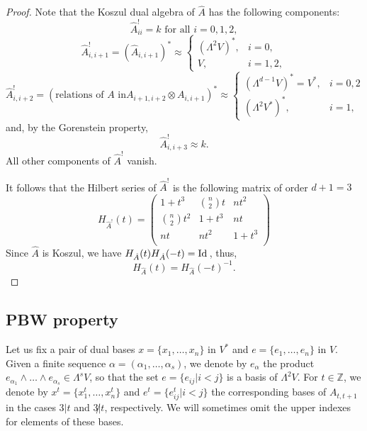 \documentclass{amsart}
\numberwithin{equation}{section}
\theoremstyle{plain}
\theoremstyle{definition}
\begin{document}
\begin{proof}
Note that the Koszul dual algebra of $\hat A$ has the following
components:
$$
\hat A_{ii}^! = k \mbox{ for all } i =0, 1,2,
$$
$$
\hat A_{i,i+1}^! = (\hat A_{i,i+1})^* \approx
    \left\{
       \begin{array}{ll}
        \left( {\Lambda}^2 V \right)^*,
              & i=0,\\
              V, & i=1,2,
           \end{array}
 \right.
$$
$$
\hat A_{i,i+2}^! = (\mbox{relations of $A$ in} A_{i+1,i+2}\otimes
A_{i,i+1})^* \approx
    \left\{
       \begin{array}{ll}
                   \left( \Lambda^{d-1} V \right)^* = V^*,   & i=0,2\\
                    \left( \Lambda^2 V^* \right)^*,   & i=1,
           \end{array}
 \right.
$$
and, by the Gorenstein property,
$$
\hat A_{i,i+3}^! \approx k.
$$
All other components of $\hat A^!$ vanish.

It follows that the Hilbert series of $\hat A^!$ is the following
matrix of order $d+1 = 3$
$$
H_{\hat A^!} (t) = \left(
       \begin{array}{ccc}
           1 +t^3& \binom{n}{2} t & n t^2 \\
            \binom{n}{2} t^2 &  1+t^3           & n   t         \\
            n t        &    n  t^2     &  1+t^3\\
           \end{array}
          \right)
$$
Since $\hat A$ is Koszul, we have $H_{\hat A}(t) H_{\hat A}(-t) = {\mbox{Id\,}}$, thus,  
$$
H_{\hat A}(t) =H_{\hat A}(-t)^{-1}.
$$
 \end{proof}

\subsection{PBW property}

\label{subs:PW}
\label{subs:PBW}

Let us fix a pair of dual bases $x = \{x_1,\dots, x_n \}$ in $V^*$
and $e = \{e_1,\dots, e_n \}$ in $V$. Given a finite sequence
$\alpha = (\alpha_1, \dots, \alpha_s)$, we denote by $e_\alpha$
the product $e_{\alpha_1} \wedge \dots \wedge e_{\alpha_s} \in
\Lambda^s V$, so that the set $e=\{ e_{ij} | i<j \}$ is a basis of
$\Lambda^2 V$. For $t\in {\ensuremath{\mathbb Z}}$, we denote by $x^t=\{x_1^t,\dots,
x_n^t \}$ and $e^t = \{e_{ij}^t |  i<j  \}$ the
corresponding bases of $A_{t,t+1} $ in the cases $3 |t$ and $3
\not| t$, respectively. We will sometimes omit the upper indexes
for elements of these bases. 
\end{document}
